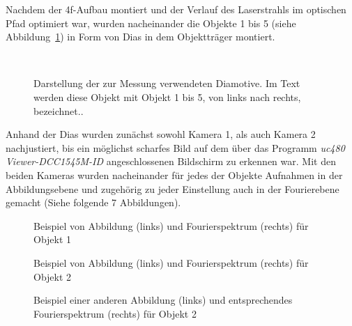 Nachdem der 4f-Aufbau montiert und der Verlauf des Laserstrahls im optischen Pfad optimiert war, wurden nacheinander die Objekte 1 bis 5 (siehe Abbildung~\ref{fig:Objekte-aus-Anleitungsheft}) in Form von Dias in dem Objektträger montiert.

\begin{figure}
	\centering
	~~
	~~
	~~
	~~
	\caption[Die zur Messung verwendeten Diamotive]{
		Darstellung der zur Messung verwendeten Diamotive. Im Text werden diese Objekt mit Objekt 1 bis 5, von links nach rechts, bezeichnet..
	}\label{fig:Objekte-aus-Anleitungsheft}
\end{figure}

Anhand der Dias wurden zunächst sowohl Kamera 1, als auch Kamera 2 nachjustiert, bis ein möglichst scharfes Bild auf dem über das Programm \textit{uc480 Viewer-DCC1545M-ID} angeschlossenen Bildschirm zu erkennen war. Mit den beiden Kameras wurden nacheinander für jedes der Objekte Aufnahmen in der Abbildungsebene und zugehörig zu jeder Einstellung auch in der Fourierebene gemacht (Siehe folgende 7 Abbildungen). 


\begin{figure}
	\centering
	\caption{
		Beispiel von Abbildung (links) und Fourierspektrum (rechts) für Objekt 1
	}
	\label{fig:example1}
\end{figure}

\begin{figure}
	\centering
	\caption{Beispiel von Abbildung (links) und Fourierspektrum (rechts) für Objekt 2}
	\label{fig:example2}
\end{figure}

\begin{figure}
	\centering
	\caption{Beispiel einer anderen Abbildung (links) und entsprechendes Fourierspektrum (rechts) für Objekt 2}
	\label{fig:example3}
\end{figure}

